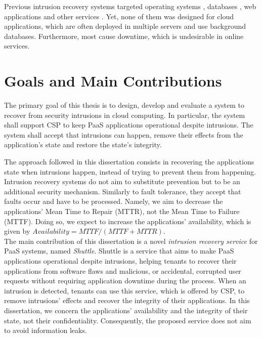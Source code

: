 Previous intrusion recovery systems targeted operating systems \cite{taser,retro}, databases \cite{itdb,phoenix}, web applications \cite{goel,warp,aire} and other services \cite{undoForOperators}. Yet, none of them was designed for cloud applications, which are often deployed in multiple servers and use background databases. Furthermore, most cause downtime, which is undesirable in online services.
 
\section{Goals and Main Contributions}\label{sec:introduction:goals}
The primary goal of this thesis is to design, develop and evaluate a system to recover from security intrusions in cloud computing. In particular, the system shall support \ac{CSP} to keep \ac{PaaS} applications operational despite intrusions. The system shall accept that intrusions can happen, remove their effects from the application's state and restore the state's integrity. 

The approach followed in this dissertation consists in recovering the applications state when intrusions happen, instead of trying to prevent them from happening. Intrusion recovery systems do not aim to substitute prevention but to be an additional security mechanism. Similarly to fault tolerance, they accept that faults occur and have to be processed. Namely, we aim to decrease the applications' Mean Time to Repair (MTTR), not the Mean Time to Failure (MTTF). Doing so, we expect to increase the applications' availability, which is given by $Availability=MTTF/(MTTF+MTTR)$. \\

The main contribution of this dissertation is a novel \emph{intrusion recovery service} for \ac{PaaS} systems, named \emph{Shuttle}. Shuttle is a service that aims to make \ac{PaaS} applications operational despite intrusions, helping tenants to recover their applications from software flaws and malicious, or accidental, corrupted user requests without requiring application downtime during the process. When an intrusion is detected, tenants can use this service, which is offered by \ac{CSP}, to remove intrusions' effects and recover the integrity of their applications. In this dissertation, we concern the applications' availability and the integrity of their state, not their confidentiality. Consequently, the proposed service does not aim to avoid information leaks.



